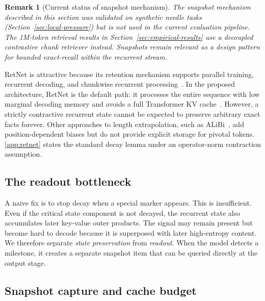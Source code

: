 \documentclass[preprint,12pt]{elsarticle}
\newtheorem{remark}[theorem]{Remark}
\begin{document}
\begin{remark}[Current status of snapshot mechanism]
The snapshot mechanism described in this section was validated on synthetic needle tasks (Section~\ref{sec:local-pressure}) but is not used in the current evaluation pipeline. The 1M-token retrieval results in Section~\ref{sec:empirical-results} use a decoupled contrastive chunk retriever instead. Snapshots remain relevant as a design pattern for bounded exact-recall within the recurrent stream.
\end{remark}

RetNet is attractive because its retention mechanism supports parallel training, recurrent decoding, and chunkwise recurrent processing~\cite{retnet}. In the proposed architecture, RetNet is the default path: it processes the entire sequence with low marginal decoding memory and avoids a full Transformer KV cache~\cite{flash2}. However, a strictly contractive recurrent state cannot be expected to preserve arbitrary exact facts forever. Other approaches to length extrapolation, such as ALiBi~\cite{alibi}, add position-dependent biases but do not provide explicit storage for pivotal tokens. \ref{app:retnet} states the standard decay lemma under an operator-norm contraction assumption.

\subsection{The readout bottleneck}

A naive fix is to stop decay when a special marker appears. This is insufficient. Even if the critical state component is not decayed, the recurrent state also accumulates later key-value outer products. The signal may remain present but become hard to decode because it is superposed with later high-entropy content. We therefore separate \emph{state preservation} from \emph{readout}. When the model detects a milestone, it creates a separate snapshot item that can be queried directly at the output stage.

\subsection{Snapshot capture and cache budget}
\end{document}
